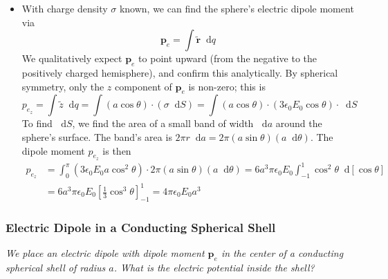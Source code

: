 \documentclass[11pt, a4paper]{article}
\newcommand{\diff}{\mathop{}\!\mathrm{d}} %
\renewcommand{\vec}[1]{\bm{#1}} %
\newcommand{\tvec}[1]{\tilde{\vec{#1}}} %
\newcommand{\ee}{\epsilon_{0}}  %
\newcommand{\pe}{\vec{p}_{e}}  %
\begin{document}
\begin{itemize}
	\item With charge density $ \sigma $ known, we can find the sphere's electric dipole moment via
	\begin{equation*}
		\vec{p}_{e} = \int \tvec{r} \diff q
	\end{equation*}
	We qualitatively expect $ \vec{p}_{e} $ to point upward (from the negative to the positively charged hemisphere), and confirm this analytically. By spherical symmetry, only the $ z $ component of $ \vec{p}_{e} $ is non-zero; this is
	\begin{equation*}
		p_{e_{z}} = \int \tilde{z} \diff q = \int (a \cos \theta) \cdot (\sigma \diff S) = \int( a \cos \theta) \cdot (3 \ee E_{0} \cos \theta) \cdot \diff S
	\end{equation*}
	To find $ \diff S $, we find the area of a small band of width $ \diff a $ around the sphere's surface. The band's area is $ 2\pi r \diff a = 2\pi (a \sin \theta ) (a \diff \theta) $. The dipole moment $ p_{e_{z}} $ is then
	\begin{align*}
		p_{e_{z}} &= \int_{0}^{\pi}(3\ee E_{0}a\cos^{2}\theta) \cdot 2\pi (a \sin \theta ) (a \diff \theta) = 6a^{3}\pi \ee E_{0} \int_{-1}^{1}\cos^{2}\theta \diff [\cos \theta]\\
		& = 6a^{3}\pi \ee E_{0} \left[\frac{1}{3}\cos^{3}\theta \right]_{-1}^{1} = 4\pi \ee E_{0} a^{3}
	\end{align*}
\end{itemize}

\subsubsection{Electric Dipole in a Conducting Spherical Shell}
\textit{We place an electric dipole with dipole moment $ \pe $ in the center of a conducting spherical shell of radius $ a $. What is the electric potential inside the shell?}
\end{document}
